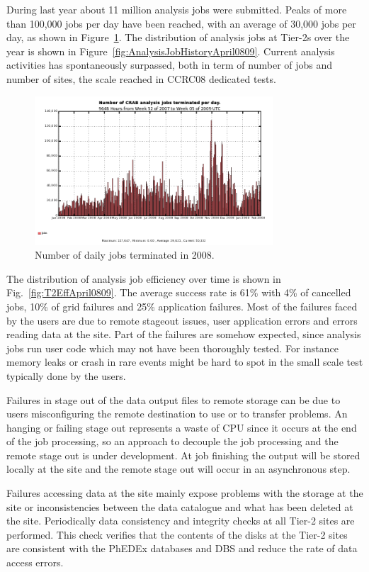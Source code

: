 During last year about 11 million analysis jobs were submitted.  Peaks
of more than 100,000 jobs per day have been reached, with an average
of 30,000 jobs per day, as shown in Figure~\ref{fig:jobs}.
The distribution of analysis jobs at Tier-2s over the year is shown in Figure~\ref{fig:AnalysisJobHistoryApril0809}. Current analysis activities has spontaneously surpassed, both in term of number of jobs and number of sites, the scale reached in CCRC08 dedicated tests. 
\begin{figure}
\includegraphics[width=3.5in]{figures/crabjobsdaily.png}
\caption{Number of daily jobs terminated in 2008. }
\label{fig:jobs}
\end{figure}

The distribution of analysis job efficiency over time is shown in Fig.~\ref{fig:T2EffApril0809}. The average success rate is 61\% with 4\% of cancelled jobs, 10\% of grid failures and 25\% application failures.
Most of the failures faced by the users are due to remote stageout issues, user application errors and errors reading data at the site. 
Part of the failures are somehow expected, since analysis jobs run user code which may not have been thoroughly tested. For instance memory leaks or crash in rare events might be hard to spot in the small scale test typically done by the users.

Failures in stage out of the data output files to remote storage can be due 
to users misconfiguring the remote destination to use or to transfer problems.
An hanging or failing stage out represents a waste of CPU since it occurs at 
the end of the job processing, so an approach to decouple the job processing and the remote stage out is under development. At job finishing the output will be stored locally at the site and the remote stage out will occur in an asynchronous step.

Failures accessing data at the site mainly expose problems with the storage at the site or inconsistencies between the data catalogue and what has been deleted at the site. 
Periodically data consistency and integrity checks at all Tier-2 sites are performed. This check verifies that the contents of the disks at the Tier-2 sites are consistent with the PhEDEx databases and DBS and reduce the rate of data access errors.

